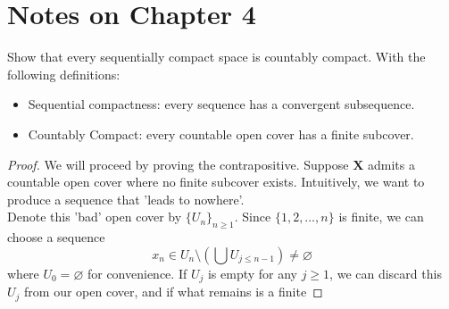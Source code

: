 \documentclass[../../main.tex]{subfiles}
\begin{document}
\providecommand{\szz}{\mathcal{S}}
\providecommand{\ccinf}{C_c^\infty}
\section*{Notes on Chapter 4}
\begin{wts}
    Show that every sequentially compact space is countably compact. With the following definitions:
    \begin{itemize}
    \item Sequential compactness: every sequence has a convergent subsequence.
    \item Countably Compact: every countable open cover has a finite subcover.
    \end{itemize}
\end{wts}
\providecommand{\xx}{\mathbf{X}}
\begin{proof}
    We will proceed by proving the contrapositive. Suppose $\xx$ admits a countable open cover where no finite subcover exists. Intuitively, we want to produce a sequence that 'leads to nowhere'.\\
    
    Denote this 'bad' open cover by $\{U_n\}_{n\geq 1}$. Since $\{1,2,\ldots,n\}$ is finite, we can choose a sequence 
    \[
        x_n\in U_n \setminus \left(\bigcup U_{j\leq n-1}\right)\neq\varnothing
    \]
    where $U_0=\varnothing$ for convenience.  If $U_j$ is empty for any $j\geq 1$, we can discard this $U_j$ from our open cover, and if what remains is a finite
\end{proof}\newpage
\end{document}
